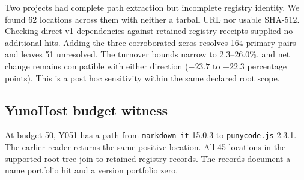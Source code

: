 Two projects had complete path extraction but incomplete registry
identity. We found 62 locations across them with neither a tarball URL
nor usable SHA-512. Checking direct v1 dependencies against retained
registry receipts supplied no additional hits. Adding the three
corroborated zeros resolves 164 primary pairs and leaves 51 unresolved.
The turnover bounds narrow to 2.3--26.0\%, and net change remains
compatible with either direction ($-23.7$ to $+22.3$ percentage points).
This is a post hoc sensitivity within the same declared root scope.

\subsection{YunoHost budget witness}
At budget 50, Y051 has a path from \texttt{markdown-it} 15.0.3 to
\texttt{punycode.js} 2.3.1. The earlier reader returns the same positive
location. All 45 locations in the supported root tree join to retained
registry records. The records document a name portfolio hit and a
version portfolio zero.

